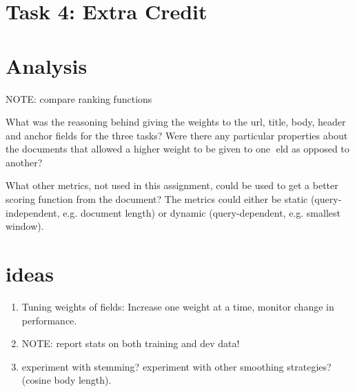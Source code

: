 \documentclass[10pt,twocolumn]{article}
\begin{document}
\section{Task 4: Extra Credit}

\section{Analysis}
NOTE: compare ranking functions

What was the reasoning behind giving the weights to the url, title,
body, header and anchor fields for the three tasks? Were there any
particular properties about the documents that allowed a higher weight
to be given to one eld as opposed to another?

What other metrics, not used in this assignment, could be used to
get a better scoring function from the document? The metrics could
either be static (query-independent, e.g. document length) or dynamic
(query-dependent, e.g. smallest window).

\section{ideas}
\begin{enumerate}
\item 
Tuning weights of fields: Increase one weight at a time, monitor change in performance.
\item
NOTE: report stats on both training and dev data!
\item 
experiment with stemming? experiment with other smoothing strategies?(cosine body length).
\end{enumerate}
\end{document}
